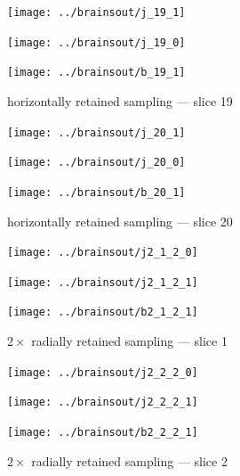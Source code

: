 \documentclass{article}
\begin{document}
\begin{figure}
\begin{centering}

\parbox{\imsize}{\texttt{[image: ../brainsout/j\_19\_1]}}

\vspace{\vertsep}

\parbox{\imsize}{\texttt{[image: ../brainsout/j\_19\_0]}}

\vspace{\vertsep}

\parbox{\imsize}{\texttt{[image: ../brainsout/b\_19\_1]}}

\end{centering}
\caption{horizontally retained sampling --- slice 19}
\end{figure}


\begin{figure}
\begin{centering}

\parbox{\imsize}{\texttt{[image: ../brainsout/j\_20\_1]}}

\vspace{\vertsep}

\parbox{\imsize}{\texttt{[image: ../brainsout/j\_20\_0]}}

\vspace{\vertsep}

\parbox{\imsize}{\texttt{[image: ../brainsout/b\_20\_1]}}

\end{centering}
\caption{horizontally retained sampling --- slice 20}
\end{figure}



\begin{figure}
\begin{centering}

\parbox{\imsizes}{\texttt{[image: ../brainsout/j2\_1\_2\_0]}}

\vspace{\vertseps}

\parbox{\imsizes}{\texttt{[image: ../brainsout/j2\_1\_2\_1]}}
\hfill
\parbox{\imsizes}{\texttt{[image: ../brainsout/b2\_1\_2\_1]}}

\end{centering}
\caption{$2\times$ radially retained sampling --- slice 1}
\end{figure}


\begin{figure}
\begin{centering}

\parbox{\imsizes}{\texttt{[image: ../brainsout/j2\_2\_2\_0]}}

\vspace{\vertseps}

\parbox{\imsizes}{\texttt{[image: ../brainsout/j2\_2\_2\_1]}}
\hfill
\parbox{\imsizes}{\texttt{[image: ../brainsout/b2\_2\_2\_1]}}

\end{centering}
\caption{$2\times$ radially retained sampling --- slice 2}
\end{figure}
\end{document}
